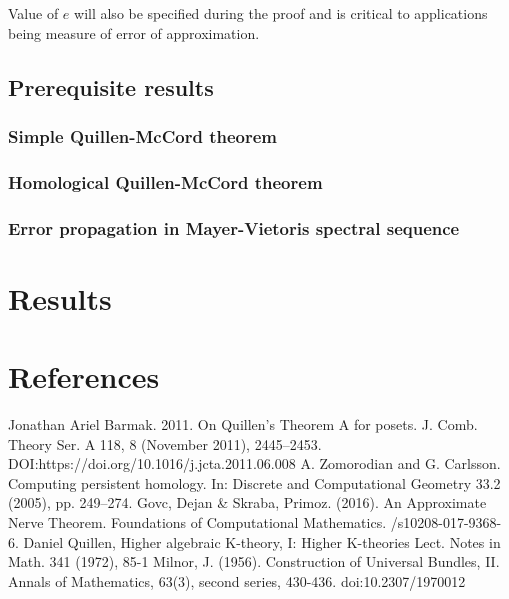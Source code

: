 \documentclass[a4paper, 12pt]{article}
\theoremstyle{definition}
\theoremstyle{remark}
\begin{document}
Value of $e$ will also be specified during the proof and is critical to applications being measure of error of approximation.

\subsection{Prerequisite results}

\subsubsection{Simple Quillen-McCord theorem}

\subsubsection{Homological Quillen-McCord theorem}

\subsubsection{Error propagation in Mayer-Vietoris spectral sequence}

\section{Results}

\section{References}

\begin{enumerate}
  Jonathan Ariel Barmak. 2011.
  \newblock On Quillen’s Theorem A for posets.
  \newblock J. Comb. Theory Ser. A 118, 8 (November 2011), 2445–2453.
  \newblock DOI:https://doi.org/10.1016/j.jcta.2011.06.008
  A. Zomorodian and G. Carlsson.
  \newblock Computing persistent homology.
  \newblock In: Discrete and Computational Geometry 33.2 (2005), pp. 249–274.
  Govc, Dejan \& Skraba, Primoz. (2016).
  \newblock An Approximate Nerve Theorem.
  \newblock Foundations of Computational Mathematics.
  /s10208-017-9368-6.
  Daniel Quillen,
  \newblock Higher algebraic K-theory, I: Higher K-theories Lect.
  \newblock Notes in Math. 341 (1972), 85-1
  Milnor, J. (1956).
  \newblock Construction of Universal Bundles, II.
  \newblock Annals of Mathematics, 63(3), second series, 430-436.
  \newblock doi:10.2307/1970012
\end{enumerate}
\end{document}
